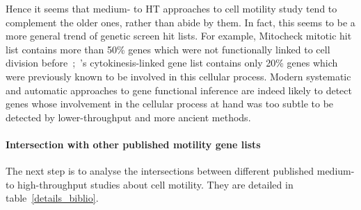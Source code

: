 Hence it seems that medium- to HT approaches to cell motility study
tend to complement the older ones, rather than abide by them. 
In fact, this seems to be a more general trend of genetic screen hit lists. For
example, Mitocheck mitotic hit list contains more than 50\% genes
which were not functionally linked to cell division
before~\cite{pmid20360735};~\cite{pmid15547975}'s cytokinesis-linked
gene list contains only 20\% genes which were previously known to be
involved in this cellular process. Modern systematic and automatic
approaches to gene functional inference are indeed likely to detect
genes whose involvement in the cellular process at hand was too subtle
to be detected by lower-throughput and more ancient methods. 

%
%

\paragraph{Intersection with other published motility gene lists }The
next step is to analyse the intersections between different published
medium- to high-throughput studies 
about cell motility. They are detailed in table~\ref{details_biblio}. 

